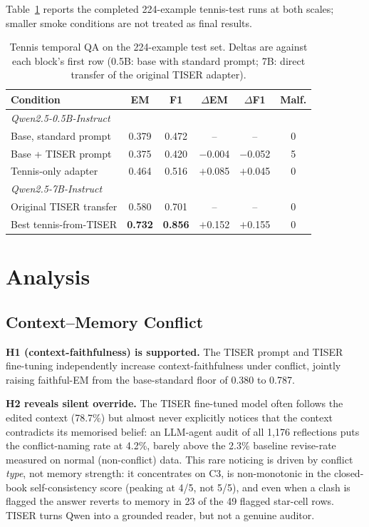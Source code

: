 \documentclass[conference]{IEEEtran}
\begin{document}
Table~\ref{tab:tennis} reports the completed 224-example tennis-test runs at both scales; smaller smoke conditions are not treated as final results.

\begin{table}[t]
\centering
\caption{Tennis temporal QA on the 224-example test set. Deltas are against each block's first row (0.5B: base with standard prompt; 7B: direct transfer of the original TISER adapter).}
\label{tab:tennis}
\setlength{\tabcolsep}{3pt}
{\footnotesize
\begin{tabular}{lccccc}
\toprule
\textbf{Condition} & \textbf{EM} & \textbf{F1} & \textbf{$\Delta$EM} & \textbf{$\Delta$F1} & \textbf{Malf.} \\
\midrule
\multicolumn{6}{l}{\emph{Qwen2.5-0.5B-Instruct}} \\
Base, standard prompt   & 0.379 & 0.472 & -- & -- & 0 \\
Base + TISER prompt     & 0.375 & 0.420 & $-$0.004 & $-$0.052 & 5 \\
Tennis-only adapter     & 0.464 & 0.516 & $+$0.085 & $+$0.045 & 0 \\
\midrule
\multicolumn{6}{l}{\emph{Qwen2.5-7B-Instruct}} \\
Original TISER transfer & 0.580 & 0.701 & -- & -- & 0 \\
Best tennis-from-TISER  & \textbf{0.732} & \textbf{0.856} & $+$0.152 & $+$0.155 & 0 \\
\bottomrule
\end{tabular}
}
\end{table}

\section{Analysis}

\subsection{Context--Memory Conflict}

\textbf{H1 (context-faithfulness) is supported.} The TISER prompt and TISER fine-tuning independently increase context-faithfulness under conflict, jointly raising faithful-EM from the base-standard floor of 0.380 to 0.787.

\textbf{H2 reveals silent override.} The TISER fine-tuned model often follows the edited context (78.7\%) but almost never explicitly notices that the context contradicts its memorised belief: an LLM-agent audit of all 1,176 reflections puts the conflict-naming rate at 4.2\%, barely above the 2.3\% baseline revise-rate measured on normal (non-conflict) data. This rare noticing is driven by conflict \emph{type}, not memory strength: it concentrates on C3, is non-monotonic in the closed-book self-consistency score (peaking at 4/5, not 5/5), and even when a clash is flagged the answer reverts to memory in 23 of the 49 flagged star-cell rows. TISER turns Qwen into a grounded reader, but not a genuine auditor.
\end{document}
